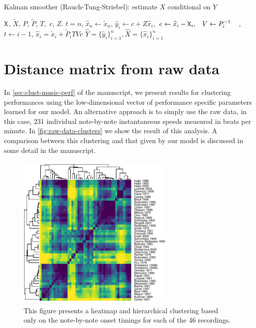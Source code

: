 \documentclass[12pt]{article}
\renewcommand{\hat}{\widehat}
\DeclareRobustCommand{\varx}{{\mathpalette\irchi\relax}}
\newcommand{\irchi}[2]{\protect\raisebox{\depth}{$#1\upchi$}}
\begin{document}
\begin{algorithm}
  \caption{Kalman smoother (Rauch-Tung-Striebel): estimate $\hat{X}$ conditional on
    $Y$\label{alg:kalman-smoother}} 
  \begin{algorithmic}
     $\varx$, $\widetilde{X}$, $P$, $\widetilde{P}$,
    $T,$ $c$, $Z$.
    \STATE $t=n$,
    \STATE $\hat{x}_{n}\leftarrow \widetilde{x}_n$, 
    \STATE $\hat{y}_i \leftarrow c + Z\hat{x}_i,$
    \STATE $\begin{aligned} e &\leftarrow \hat{x}_i -
      \varx_i, & V &\leftarrow P_i^{-1}\end{aligned}$,
    \STATE $t\leftarrow i-1$, 
    \STATE $\hat{x}_i = \widetilde{x}_i + \widetilde{P}_i T Ve $ 
    \ENDWHILE
    \RETURN $\widehat{Y}=\{\hat{y}_i\}_{i=1}^n, \hat{X}=\{\hat{x}_i\}_{i=1}^n$
  \end{algorithmic}
\end{algorithm}

\hypertarget{distance-matrix-from-raw-data}{%
\section{Distance matrix from raw
data}\label{distance-matrix-from-raw-data}}

In \autoref{sec:clust-music-perf} of the manuscript, we present results
for clustering performances using the low-dimensional vector of
performance specific parameters learned for our model. An alternative
approach is to simply use the raw data, in this case, 231 individual
note-by-note instantaneous speeds measured in beats per minute. In
\autoref{fig:raw-data-clusters} we show the result of this analysis. A
comparison between this clustering and that given by our model is
discussed in some detail in the manuscript.

\begin{figure}[b]

{\centering \includegraphics[width=3in,height=3in]{gfx/raw-data-clusters-1} 

}

\caption{This figure presents a heatmap and hierarchical clustering based only on the note-by-note onset timings for each of the 46 recordings.}\label{fig:raw-data-clusters}
\end{figure}
\end{document}
